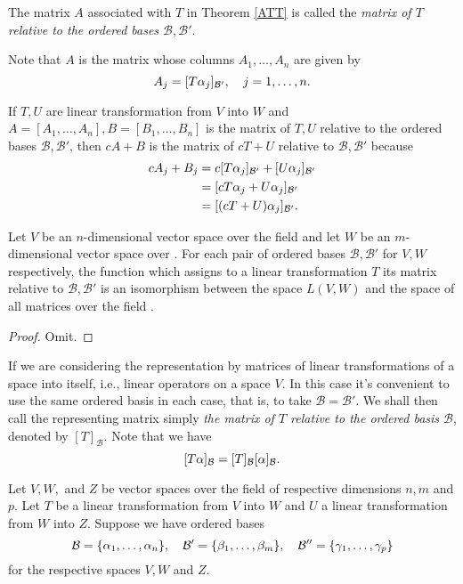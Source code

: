 \documentclass{mynotes}
\begin{document}
\begin{definition}
The matrix $A$ associated with $T$ in Theorem \ref{ATT} is called the \emph{matrix of $T$ relative to the ordered bases $\mathcal{B},\mathcal{B}'$}.
\end{definition}
\begin{remark}
Note that $A$ is the matrix whose columns $A_1,\ldots,A_n$ are given by $$A_j=[T\alpha_j]_{\mathcal{B}'},\quad j=1,\ldots,n.$$
\end{remark}
\begin{remark}
If $T,U$ are linear transformation from $V$ into $W$ and $A=[A_1,\ldots,A_n],B=[B_1,\ldots,B_n]$ is the matrix of $T,U$ relative to the ordered bases $\mathcal{B},\mathcal{B}'$, then $cA+B$ is the matrix of $cT+U$ relative to $\mathcal{B},\mathcal{B}'$ because
\begin{align*}
cA_j+B_j &= c[T\alpha_j]_{\mathcal{B}'}+[U\alpha_j]_{\mathcal{B}'}\\&=[cT\alpha_j+U\alpha_j]_{\mathcal{B}'}\\&=[(cT+U)\alpha_j]_{\mathcal{B}'}.
\end{align*}
\end{remark}
\begin{theorem}
Let $V$ be an $n$-dimensional vector space over the field \F and let $W$ be an $m$-dimensional vector space over \F. For each pair of ordered bases $\mathcal{B},\mathcal{B}'$ for $V,W$ respectively, the function which assigns to a linear transformation $T$ its matrix relative to $\mathcal{B},\mathcal{B}'$ is an isomorphism between the space $L(V,W)$ and the space of all \mbyn{} matrices over the field \F.
\end{theorem}
\begin{proof}
Omit.
\end{proof}
\begin{remark}
If we are considering the representation by matrices of linear transformations of a space into itself, i.e., linear operators on a space $V$. In this case it's convenient to use the same ordered basis in each case, that is, to take $\mathcal{B}=\mathcal{B'}$. We shall then call the representing matrix simply \emph{the matrix of $T$ relative to the ordered basis $\mathcal{B}$}, denoted by $[T]_{\mathcal{B}}$. Note that we have$$[T\alpha]_{\mathcal{B}}=[T]_{\mathcal{B}}[\alpha]_{\mathcal{B}}.$$
\end{remark}
Let $V,W,$ and $Z$ be vector spaces over the field \F of respective dimensions $n,m$ and$p$. Let $T$ be a linear transformation from $V$ into $W$ and $U$ a linear transformation from $W$ into $Z$. Suppose we have ordered bases
$$\mathcal{B}=\{\alpha_1,\ldots,\alpha_n\},\quad\mathcal{B'}=\{\beta_1,\ldots,\beta_m\},\quad\mathcal{B''}=\{\gamma_1,\ldots,\gamma_p\}$$for the respective spaces $V,W$ and $Z$.
\end{document}
